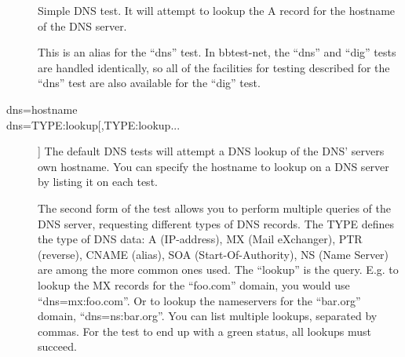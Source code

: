  \begin{description}
\item[] Simple DNS test. It will attempt to lookup the A record for the hostname of the DNS server. 

 

\item[] This is an alias for the ``dns'' test. In bbtest-net, the
  ``dns'' and ``dig'' tests are handled identically, so all of the
  facilities for testing described for the ``dns'' test are also
  available for the ``dig'' test. 


 

\item[dns=hostname]
\item[dns=TYPE:lookup[,TYPE:lookup...]] The default DNS tests will
  attempt a DNS lookup of the DNS' servers own hostname. You can
  specify the hostname to lookup on a DNS server by listing it on each
  test. 


  The second form of the test allows you to perform multiple queries
  of the DNS server, requesting different types of DNS records. The
  TYPE defines the type of DNS data: A (IP-address), MX (Mail
  eXchanger), PTR (reverse), CNAME (alias), SOA (Start-Of-Authority),
  NS (Name Server) are among the more common ones used. The ``lookup''
  is the query. E.g. to lookup the MX records for the ``foo.com''
  domain, you would use ``dns=mx:foo.com''. Or to lookup the
  nameservers for the ``bar.org'' domain, ``dns=ns:bar.org''. You can
  list multiple lookups, separated by commas. For the test to end up
  with a green status, all lookups must succeed. 



 



\end{description}

